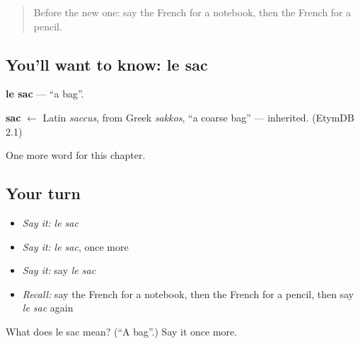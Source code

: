 \begin{quote}
Before the new one: say the French for a notebook, then the French for a pencil.
\end{quote}

\subsection*{You'll want to know: le sac}
\textbf{le sac} — \textquotedblleft{}a bag\textquotedblright{}.

\begin{cousinweb}
\textbf{sac} $\leftarrow$ Latin \emph{saccus}, from Greek \emph{sakkos}, \textquotedblleft{}a coarse bag\textquotedblright{} — inherited. (EtymDB 2.1)
\end{cousinweb}

\begin{grammarlens}[title={What you've built}]
One more word for this chapter.
\end{grammarlens}

\subsection*{Your turn}
\begin{itemize}
\raggedright
  \item \emph{Say it:} \emph{le sac}
  \item \emph{Say it:} \emph{le sac}, once more
  \item \emph{Say it:} say \emph{le sac}
  \item \emph{Recall:} say the French for a notebook, then the French for a pencil, then say \emph{le sac} again
\end{itemize}

\begin{tcolorbox}[breakable,colback=teal!4,colframe=teal!35!black,title={Before you move on}]
What does le sac mean? (\textquotedblleft{}A bag\textquotedblright{}.) Say it once more.
\end{tcolorbox}
